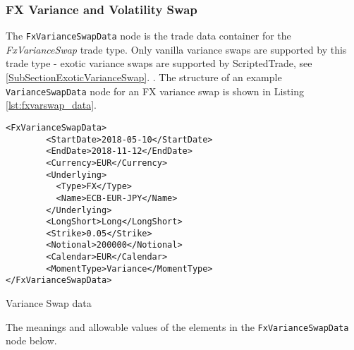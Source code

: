 \subsubsection{FX Variance and Volatility Swap}
\label{SubSectionFxVarianceSwap}

The \lstinline!FxVarianceSwapData! node is the trade data container for the \emph{FxVarianceSwap} trade type. Only vanilla variance swaps are supported by this trade type - exotic variance swaps are supported by ScriptedTrade\ifdefined\ProductCatalogueBuild, see  \ref{SubSectionExoticVarianceSwap}. \else. \fi
The structure of an example \lstinline!VarianceSwapData! node for an FX variance swap is shown in Listing \ref{lst:fxvarswap_data}.

\begin{listing}[H]
	\begin{verbatim}
<FxVarianceSwapData>
        <StartDate>2018-05-10</StartDate>
        <EndDate>2018-11-12</EndDate>
        <Currency>EUR</Currency>
        <Underlying>
          <Type>FX</Type>
          <Name>ECB-EUR-JPY</Name>
        </Underlying>
        <LongShort>Long</LongShort>
        <Strike>0.05</Strike>
        <Notional>200000</Notional>
        <Calendar>EUR</Calendar>
        <MomentType>Variance</MomentType>
</FxVarianceSwapData>
	\end{verbatim}
	\caption{Variance Swap data}
	\label{lst:fxvarswap_data}
\end{listing}

The meanings and allowable values of the elements in the \lstinline!FxVarianceSwapData! node below.

